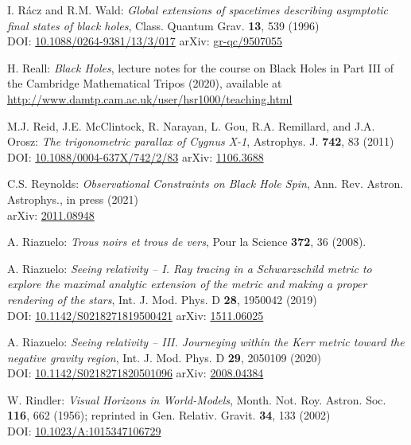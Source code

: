 \begin{thebibliography}{123}
I. R\'acz and R.M. Wald:
{\em Global extensions of spacetimes describing asymptotic final states of black holes},
Class. Quantum Grav. {\bf 13}, 539 (1996)\\
DOI: \href{https://doi.org/10.1088/0264-9381/13/3/017}{10.1088/0264-9381/13/3/017}\hfill
arXiv: \href{https://arxiv.org/abs/gr-qc/9507055}{gr-qc/9507055}

H. Reall: {\em Black Holes}, lecture notes for the course on Black Holes in
Part III of the Cambridge Mathematical Tripos (2020), available at \\
\url{http://www.damtp.cam.ac.uk/user/hsr1000/teaching.html}

M.J. Reid, J.E. McClintock, R. Narayan, L. Gou, R.A. Remillard, and J.A. Orosz:
{\em The trigonometric parallax of Cygnus X-1},
Astrophys. J. {\bf 742}, 83 (2011)\\
DOI: \href{https://doi.org/10.1088/0004-637X/742/2/83}{10.1088/0004-637X/742/2/83}\hfill
arXiv: \href{https://arxiv.org/abs/1106.3688}{1106.3688}

C.S. Reynolds:
{\em Observational Constraints on Black Hole Spin},
Ann. Rev. Astron. Astrophys., in press (2021)\\
arXiv: \href{https://arxiv.org/abs/2011.08948}{2011.08948}

A. Riazuelo:
{\em Trous noirs et trous de vers},
Pour la Science {\bf 372}, 36 (2008).

A. Riazuelo:
{\em Seeing relativity -- I. Ray tracing in a Schwarzschild metric to explore the maximal analytic extension of the metric and making a proper rendering of the stars},
Int. J. Mod. Phys. D {\bf 28}, 1950042 (2019)\\
DOI: \href{https://doi.org/10.1142/S0218271819500421}{10.1142/S0218271819500421}
\hfill
arXiv: \href{https://arxiv.org/abs/1511.06025}{1511.06025}

A. Riazuelo:
{\em Seeing relativity -- III. Journeying within the Kerr metric toward the negative gravity region},
Int. J. Mod. Phys. D {\bf 29}, 2050109 (2020)\\
DOI: \href{https://doi.org/10.1142/S0218271820501096}{10.1142/S0218271820501096}\hfill
arXiv: \href{https://arxiv.org/abs/2008.04384}{2008.04384}

W. Rindler: {\em Visual Horizons in World-Models},
Month. Not. Roy. Astron. Soc. {\bf 116}, 662 (1956);
reprinted in Gen. Relativ. Gravit. {\bf 34}, 133 (2002)\\
DOI: \href{https://doi.org/10.1023/A:1015347106729}{10.1023/A:1015347106729}


\end{thebibliography}
